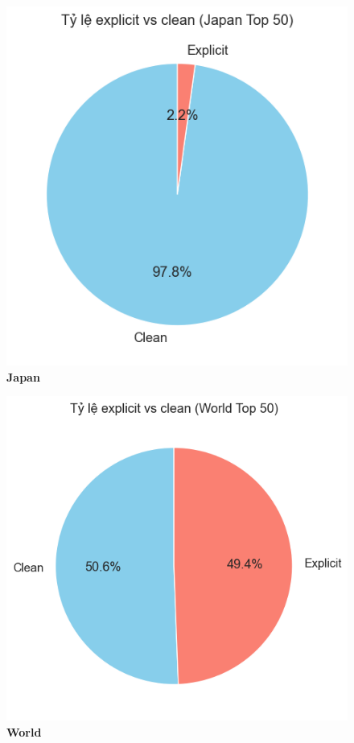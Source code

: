 \begin{itemize}
\begin{figure}[H]
    \centering
    \begin{minipage}{0.38\textwidth}
        \centering
        \includegraphics[width=\linewidth]{../graphics/data_top50/34/EDA_japan.png}
        \\[4pt] {\small \textbf{Japan}}
    \end{minipage}
    \hfill
    \begin{minipage}{0.38\textwidth}
        \centering
        \includegraphics[width=\linewidth]{../graphics/data_top50/34/EDA_world.png}
        \\[4pt] {\small \textbf{World}}
    \end{minipage}


\end{figure}
\end{itemize}
